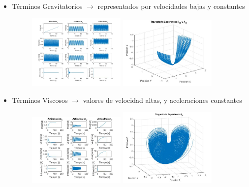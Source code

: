 \begin{itemize}
	
	\item Términos Gravitatorios $ \rightarrow $ representados por velocidades bajas y constantes
	
	\begin{figure}[h!]	
		\centering
		\includegraphics[width=0.45\textwidth]{graftheta10y11}
		\includegraphics[width=0.45\textwidth]{Traytheta10y11}
	\end{figure}
	\newpage
	\item Términos Viscosos $ \rightarrow $ valores de velocidad altas, y aceleraciones constantes
	
	\begin{figure}[h!]
		\centering
		\includegraphics[width=0.45\textwidth]{graftheta9}
		\includegraphics[width=0.45\textwidth]{Traytheta9}
	\end{figure}
	


\end{itemize}
